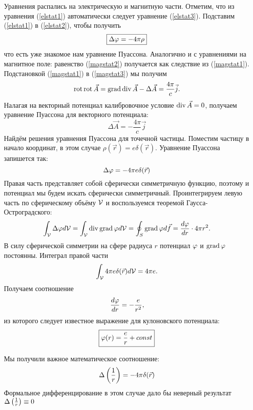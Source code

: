     Уравнения распались на электрическую и магнитную части. Отметим, что из уравнения (\ref{elstat1}) автоматически следует
    уравнение (\ref{elstat3}). Подставим (\ref{elstat1}) в (\ref{elstat2}), чтобы получить
    \[\boxed{
        \Delta\varphi = -4\pi\rho}
    \]
    что есть уже знакомое нам уравнение Пуассона. Аналогично и с уравнениями на магнитное поле: равенство (\ref{magstat2}) получается
    как следствие из (\ref{magstat1}). Подстановкой (\ref{magstat1}) в (\ref{magstat3}) мы получим
    \[
        \operatorname{rot}\operatorname{rot}\vec{A} = \operatorname{grad}\operatorname{div}\vec{A} - \Delta\vec{A} = \frac{4\pi}{c}\vec{j}.
    \]
    Налагая на векторный потенциал калибровочное условие $\operatorname{div}\vec{A} = 0$, получаем уравнение Пуассона для векторного потенциала:
    \begin{equation}\boxed{
        \Delta\vec{A} = -\frac{4\pi}{c}\vec{j}} \label{mag_Poisson}
    \end{equation}
    Найдём решения уравнения Пуассона для точечной частицы. Поместим частицу в начало координат, в этом случае $\rho(\vec{r}) = e\delta(\vec{r})$.
    Уравнение Пуассона запишется так:
    \[
        \Delta\varphi = -4\pi e\delta(\vec{r})
    \]
    Правая часть представляет собой сферически симметричную функцию, поэтому и потенциал мы будем искать сферически симметричный.
    Проинтегрируем левую часть по сферическому объёму $\mathcal{V}$ и воспользуемся теоремой Гаусса-Остроградского:
    \begin{gather*}
        \int_{\mathcal{V}}\Delta\varphi d\mathcal{V} = \int_{\mathcal{V}}\operatorname{div}\operatorname{grad}\varphi d\mathcal{V} = 
        \oint_{S}\operatorname{grad}\varphi d\vec{f} = \frac{d\varphi}{dr}\cdot 4\pi r^2.
    \end{gather*}
    В силу сферической симметрии на сфере радиуса $r$ потенциал $\varphi$ и $\operatorname{grad}\varphi$ постоянны. Интеграл правой части
    \[
        \int_{\mathcal{V}} 4\pi e\delta(\vec{r})d\mathcal{V} = 4\pi e.
    \]
    Получаем соотношение
    \[
        \frac{d\varphi}{dr} = -\frac{e}{r^2},
    \]
    из которого следует известное выражение для кулоновского потенциала:
    \[
        \boxed{\varphi(r) = \frac{e}{r} + const}
    \]
    \begin{note}
        Мы получили важное математическое соотношение:
        \begin{equation}
            \Delta\left({\frac 1r}\right) = -4\pi \delta(\vec{r}) \label{ImportantEquation}
        \end{equation}
        Формальное дифференцирование в этом случае дало бы неверный результат $\Delta\left({\frac 1r}\right) \equiv 0$
    \end{note}
    
